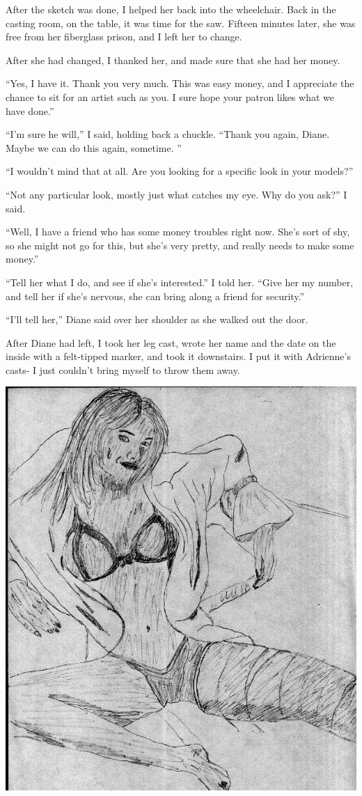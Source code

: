 After the sketch was done, I helped her back into the wheelchair. Back in the casting room, on
the table, it was time for the saw. Fifteen minutes later, she was free from her fiberglass
prison, and I left her to change.

After she had changed, I thanked her, and made sure that she had her money.

``Yes, I have it. Thank you very much. This was easy money, and I appreciate the chance to sit
for an artist such as you. I sure hope your patron likes what we have done.''

``I'm sure he will,'' I said, holding back a chuckle. ``Thank you again, Diane. Maybe we can do
this again, sometime. ''

``I wouldn't mind that at all. Are you looking for a specific look in your models?''

``Not any particular look, mostly just what catches my eye. Why do you ask?'' I said.

``Well, I have a friend who has some money troubles right now. She's sort of shy, so she might
not go for this, but she's very pretty, and really needs to make some money.''

``Tell her what I do, and see if she's interested.'' I told her. ``Give her my number, and tell
her if she's nervous, she can bring along a friend for security.''

``I'll tell her,'' Diane said over her shoulder as she walked out the door.

After Diane had left, I took her leg cast, wrote her name and the date on the inside with a
felt-tipped marker, and took it downstairs. I put it with Adrienne's casts- I just couldn't
bring myself to throw them away.

\begin{center}
\includegraphics[width=\textwidth]{images/kicks03.jpg}
\end{center}
